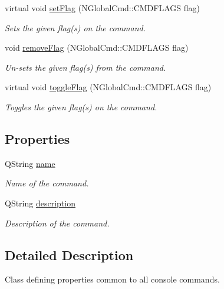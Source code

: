 \begin{DoxyCompactItemize}
virtual void \hyperlink{class_base_console_command_a3046da732d30b1de8b41f51d146b5e46}{set\-Flag} (N\-Global\-Cmd\-::\-C\-M\-D\-F\-L\-A\-G\-S flag)
\begin{DoxyCompactList}\small\item\em Sets the given flag(s) on the command. \end{DoxyCompactList}\item 
void \hyperlink{class_base_console_command_a074b1ecedbef610eaa4a0e9d378f9da9}{remove\-Flag} (N\-Global\-Cmd\-::\-C\-M\-D\-F\-L\-A\-G\-S flag)
\begin{DoxyCompactList}\small\item\em Un-\/sets the given flag(s) from the command. \end{DoxyCompactList}\item 
virtual void \hyperlink{class_base_console_command_a509caa8e6fba5c10e9ff89dd5fb665cf}{toggle\-Flag} (N\-Global\-Cmd\-::\-C\-M\-D\-F\-L\-A\-G\-S flag)
\begin{DoxyCompactList}\small\item\em Toggles the given flag(s) on the command. \end{DoxyCompactList}\end{DoxyCompactItemize}
\subsection*{Properties}
\begin{DoxyCompactItemize}
\item 
Q\-String \hyperlink{class_base_console_command_a2f21764f46a3864a362eae2e3396e363}{name}
\begin{DoxyCompactList}\small\item\em Name of the command. \end{DoxyCompactList}\item 
Q\-String \hyperlink{class_base_console_command_afcb44c52f870b7ca902da018c365b758}{description}
\begin{DoxyCompactList}\small\item\em Description of the command. \end{DoxyCompactList}\end{DoxyCompactItemize}


\subsection{Detailed Description}
Class defining properties common to all console commands. 


